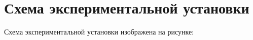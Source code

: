 \section*{Схема экспериментальной установки}

Схема экспериментальной установки изображена на рисунке:

\begin{figure}[H]
	\centering
\end{figure}
